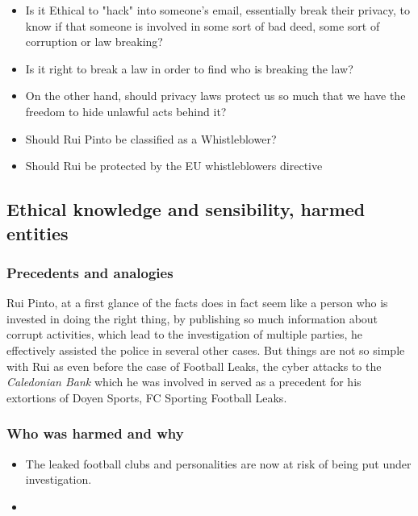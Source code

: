 \begin{itemize}
    \item Is it Ethical to "hack" into someone's email, essentially break their privacy, to know if that someone is involved in some sort of bad deed, some sort of corruption or law breaking?
    \item Is it right to break a law in order to find who is breaking the law?
    \item On the other hand, should privacy laws protect us so much that we have the freedom to hide unlawful acts behind it?
    \item Should Rui Pinto be classified as a Whistleblower?
    \item Should Rui be protected by the EU whistleblowers directive
\end{itemize}

\subsection{Ethical knowledge and sensibility, harmed entities}
\subsubsection{Precedents and analogies}
Rui Pinto, at a first glance of the facts does in fact seem like a person who is invested in doing the right thing, by publishing so much information about corrupt activities, which lead to the investigation of multiple parties, he effectively assisted the police in several other cases.
But things are not so simple with Rui as even before the case of Football Leaks, the cyber attacks to the \textit{Caledonian Bank} which he was involved in served as a precedent for his extortions of Doyen Sports, FC Sporting  Football Leaks.


\subsubsection{Who was harmed and why}
\begin{itemize}
    \item The leaked football clubs and personalities are now at risk of being put under investigation.
    \item 
\end{itemize}

